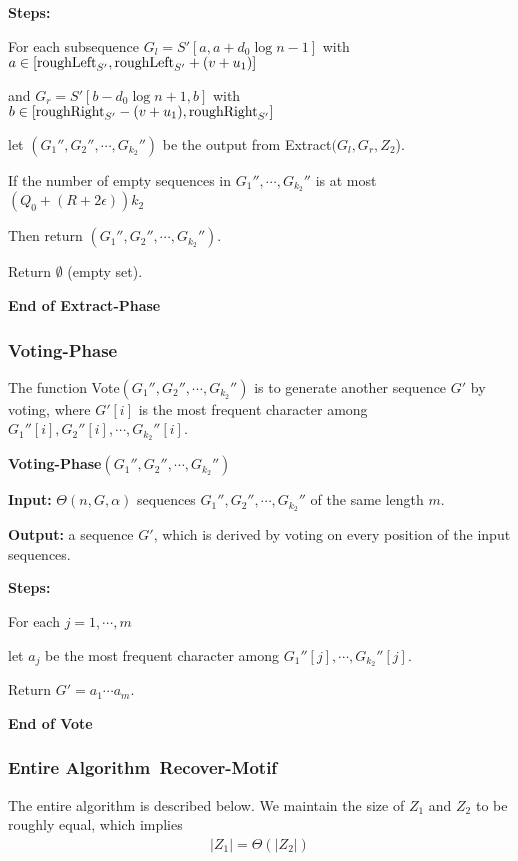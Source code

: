 \documentclass[11pt]{article}
\newcommand{\algmnam}{Recover-Motif}
\newcommand{\algmname}{Algorithm~\algmnam}
\newcommand{\algma}{\algmname~}
\newcommand{\roughright}{{\rm roughRight}}
\newcommand{\phasetwo}{Extract-Phase}
\newcommand{\phasethree}{Voting-Phase}
\begin{document}
{\bf Steps:}

\qquad For each subsequence $G_l=S'[a, a+d_0\log n-1]$ with $a\in
[{\rm roughLeft}_{S'}, {\rm roughLeft}_{S'}+(v+u_1)]$

\qquad and $G_r=S'[b-d_0\log n+1,b]$ with $b\in
[\roughright_{S'}-(v+u_1), \roughright_{S'}]$

\qquad\qquad let $(G_1'', G_2'',\cdots, G_{k_2}'')$ be the output
from Extract$(G_l, G_r, Z_2$).

\qquad\qquad  If  the number of empty sequences in $G_1'',\cdots,
G_{k_2}''$ is at most $(Q_0+(R+2\epsilon))k_2$


\qquad\qquad Then return $(G_1'', G_2'',\cdots, G_{k_2}'')$.


\qquad Return $\emptyset$ (empty set).

{\bf End of \phasetwo~}


\subsubsection{\phasethree}

The function Vote$(G_1'', G_2'',\cdots, G_{k_2}'')$ is to generate
another sequence $G'$ by voting, where $G'[i]$ is the most frequent
character among $G_1''[i], G_2''[i],\cdots, G_{k_2}''[i]$.

 \vskip 10pt

{\bf \phasethree$(G_1'', G_2'',\cdots, G_{k_2}'')$}

{\bf Input:} $\Theta(n,G,\alpha)$ sequences $G_1'', G_2'',\cdots,
G_{k_2}''$ of the same length $m$.


{\bf Output:} a sequence $G'$, which is derived by voting on every
position of the input sequences.


 {\bf Steps:}



\qquad For each $j=1,\cdots, m$

\qquad\qquad let $a_j$ be the most frequent character among
$G_1''[j],\cdots, G_{k_2}''[j]$.

\qquad Return $G'=a_1\cdots a_{m}$.

{\bf End of Vote}


\subsubsection{Entire \algma}

 The entire algorithm is described below. We maintain the size of $Z_1$ and $Z_2$ to be
roughly equal, which implies
\begin{eqnarray}
|Z_1|=\Theta(|Z_2|) \label{Z1-Z2-eqn}
\end{eqnarray}
\end{document}
